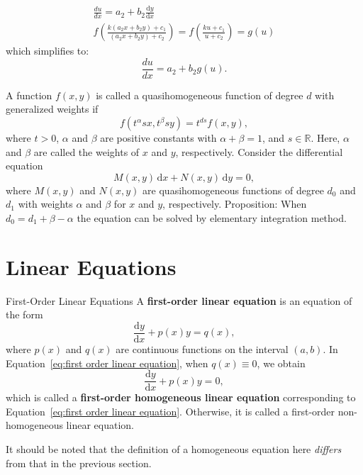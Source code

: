 \documentclass[11pt]{../../TexTemplate/elegantbook}
\begin{document}
\begin{itemize}
\begin{enumerate}
\begin{enumerate}
\begin{gather*}
                            \frac{du}{dx} = a_2 + b_2 \frac{\mathrm{d}y}{\mathrm{d}x} \\
                            f\left( \frac{k(a_2x + b_2y) + c_1}{(a_2x + b_2y) + c_2} \right) 
                                = f\left( \frac{ku + c_1}{u + c_2} \right) = g(u)
                        \end{gather*}
                        which simplifies to:
                        \[
                        \frac{du}{dx} = a_2 + b_2 g(u).
                        \]
                \end{enumerate}
        \end{enumerate}
\end{itemize}






\begin{example}
    A function \(f(x, y)\) is called a quasihomogeneous function of degree \(d\) with generalized weights if
    \[
    f(t^\alpha s x, t^\beta s y) = t^{ds} f(x, y),
    \]
    where \(t > 0\), \(\alpha\) and \(\beta\) are positive constants with \(\alpha + \beta = 1\), and \(s \in \mathbb{R}\). 
    Here, \(\alpha\) and \(\beta\) are called the weights of \(x\) and \(y\), respectively.
    Consider the differential equation
    \[
    M(x, y) \, \mathrm{d}x + N(x, y) \, \mathrm{d}y = 0,
    \]
    where \(M(x, y)\) and \(N(x, y)\) are quasihomogeneous functions of degree \(d_0\) and \(d_1\) 
    with weights \(\alpha\) and \(\beta\) for \(x\) and \(y\), respectively.
    Proposition: When \(d_0 = d_1 + \beta - \alpha\) the equation can be solved by elementary integration method.
\end{example}
\section{Linear Equations}
\begin{definition}{First-Order Linear Equations}
    A \textbf{first-order linear equation} is an equation of the form
    \begin{equation}\label{eq:first order linear equation}
        \frac{\mathrm{d}y}{\mathrm{d}x} + p(x) y = q(x),
    \end{equation}
    where \(p(x)\) and \(q(x)\) are continuous functions on the interval \((a, b)\).
    In Equation~\eqref{eq:first order linear equation}, when \(q(x) \equiv  0\), we obtain
    \begin{equation}\label{eq:first order homogeneous linear equation}
        \frac{\mathrm{d}y}{\mathrm{d}x} + p(x) y = 0,
    \end{equation}
    which is called a \textbf{first-order homogeneous linear equation} corresponding to Equation~\eqref{eq:first order linear equation}.
    Otherwise, it is called a first-order non-homogeneous linear equation.
\end{definition}
\begin{note}
    It should be noted that the definition of a homogeneous equation here \emph{differs} from that in the previous section.
\end{note}
\end{document}
